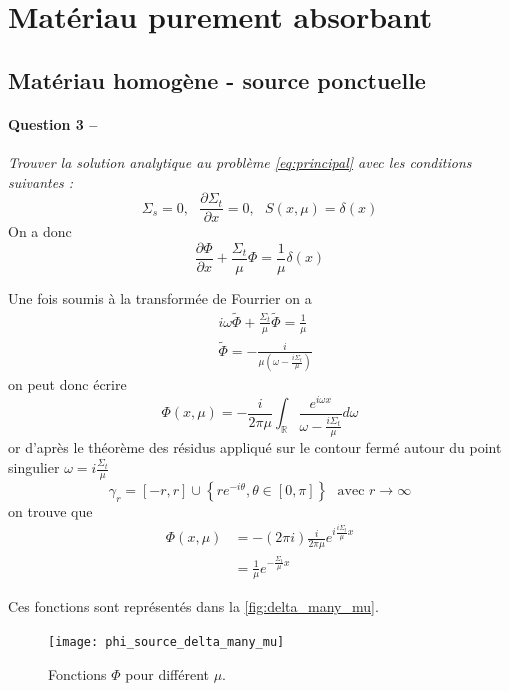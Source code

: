 \documentclass[11pt,a4paper]{article}
\newcommand{\dx}[1]{\dfrac{\partial #1}{\partial x}}
\newcommand{\question}[2]{\paragraph{Question #1 --}\hspace{-7pt}\textit{#2} \\}
\newcommand{\tphi}{\widetilde{\Phi}}
\begin{document}
\section{Matériau purement absorbant}

\subsection{Matériau homogène - source ponctuelle}

\question{3}{Trouver la solution analytique au problème \autoref{eq:principal} avec les conditions suivantes :}

\begin{equation}
  \Sigma_s=0, ~~~ \dx{\Sigma_t} = 0, ~~~ S(x, \mu) = \delta(x)
\end{equation}
On a donc 
\begin{equation}
  \dx{\Phi} + \frac{\Sigma_t}{\mu} \Phi = \frac{1}{\mu} \delta(x)
\end{equation}

Une fois soumis à la transformée de Fourrier on a 
\begin{align}
  &i \omega \tphi + \frac{\Sigma_t}{\mu} \tphi = \frac{1}{\mu} \\
  &\tphi = -\frac{i}{\mu\left(\omega - \frac{i \Sigma_t}{\mu}\right)}
\end{align}
on peut donc écrire 
\begin{equation}
  \Phi (x, \mu) = -\frac{i}{2\pi\mu} \int_{\mathbb{R}} \frac{e^{i\omega x}}{\omega - \frac{i \Sigma_t}{\mu}} d\omega 
\end{equation}
or d'après le théorème des résidus appliqué sur le contour fermé autour du point singulier $\omega = i\frac{\Sigma_t}{\mu}$
\begin{equation}
  \gamma_r = [-r,r]\cup\left\{r e^{-i \theta}, \theta \in [0, \pi] \right\} ~~~ \mbox{avec } r \to \infty
\end{equation}
on trouve que
\begin{align}
  \Phi (x, \mu) &= - (2 \pi i) \frac{i}{2\pi\mu} e^{i \frac{i \Sigma_t}{\mu} x} \\
                &= \frac{1}{\mu} e^{-\frac{\Sigma_t}{\mu} x} 
\end{align}

Ces fonctions sont représentés dans la \autoref{fig:delta_many_mu}.

\begin{figure}
  \centering
  \texttt{[image: phi\_source\_delta\_many\_mu]}
  \caption{Fonctions $\Phi$ pour différent $\mu$.}
  \label{fig:delta_many_mu}
\end{figure}
\end{document}
